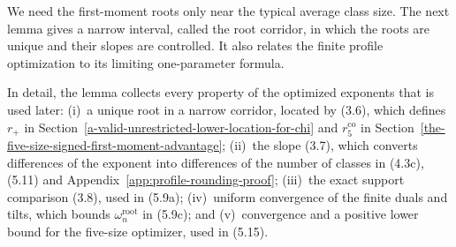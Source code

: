 \documentclass[a4paper,10pt,reqno]{amsart}
\numberwithin{equation}{section}
\theoremstyle{plain}
\theoremstyle{remark}
\begin{document}
We need the first-moment roots only near the typical average class size.
The next lemma gives a narrow interval, called the root corridor, in which
the roots are unique and their slopes are controlled. It also relates the
finite profile optimization to its limiting one-parameter formula.

In detail, the lemma collects every property of the optimized exponents that
is used later: (i)~a unique root in a narrow corridor, located by (3.6),
which defines $r_+$ in
Section~\ref{a-valid-unrestricted-lower-location-for-chi} and
$r_5^{\mathrm{co}}$ in
Section~\ref{the-five-size-signed-first-moment-advantage}; (ii)~the slope
(3.7), which converts differences of the exponent into differences of the
number of classes in (4.3c), (5.11) and
Appendix~\ref{app:profile-rounding-proof}; (iii)~the exact support
comparison (3.8), used in (5.9a); (iv)~uniform convergence of the finite
duals and tilts, which bounds $\omega_n^{\mathrm{root}}$ in (5.9c); and
(v)~convergence and a positive lower bound for the five-size optimizer, used
in (5.15).
\end{document}
